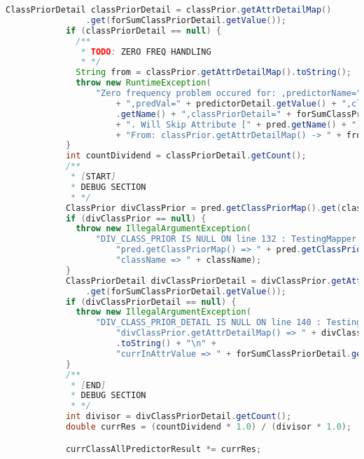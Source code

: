 \begin{lstlisting}[language=Java,basicstyle=\tiny,caption=TestingMapper.java]
            ClassPriorDetail classPriorDetail = classPrior.getAttrDetailMap()
                .get(forSumClassPriorDetail.getValue());
            if (classPriorDetail == null) {
              /**
               * TODO: ZERO FREQ HANDLING
               * */
              String from = classPrior.getAttrDetailMap().toString();
              throw new RuntimeException(
                  "Zero frequency problem occured for: ,predictorName=" + pred.getName()
                      + ",predVal=" + predictorDetail.getValue() + ",classPrior=" + classPrior
                      .getName() + ",classPriorDetail=" + forSumClassPriorDetail.getValue()
                      + ". Will Skip Attribute [" + pred.getName() + "]\n\n"
                      + "From: classPrior.getAttrDetailMap() -> " + from);
            }
            int countDividend = classPriorDetail.getCount();
            /**
             * [START]
             * DEBUG SECTION
             * */
            ClassPrior divClassPrior = pred.getClassPriorMap().get(className);
            if (divClassPrior == null) {
              throw new IllegalArgumentException(
                  "DIV_CLASS_PRIOR IS NULL ON line 132 : TestingMapper.class :: \n" +
                      "pred.getClassPriorMap() => " + pred.getClassPriorMap().toString() + "\n" +
                      "className => " + className);
            }
            ClassPriorDetail divClassPriorDetail = divClassPrior.getAttrDetailMap()
                .get(forSumClassPriorDetail.getValue());
            if (divClassPriorDetail == null) {
              throw new IllegalArgumentException(
                  "DIV_CLASS_PRIOR_DETAIL IS NULL ON line 140 : TestingMapper.class :: \n" +
                      "divClassPrior.getAttrDetailMap() => " + divClassPrior.getAttrDetailMap()
                      .toString() + "\n" +
                      "currInAttrValue => " + forSumClassPriorDetail.getValue());
            }
            /**
             * [END]
             * DEBUG SECTION
             * */
            int divisor = divClassPriorDetail.getCount();
            double currRes = (countDividend * 1.0) / (divisor * 1.0);

            currClassAllPredictorResult *= currRes;


\end{lstlisting}
